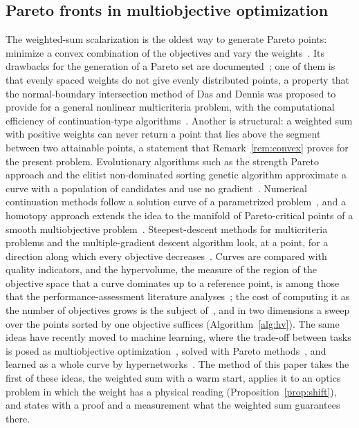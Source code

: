 \subsection{Pareto fronts in multiobjective optimization}

The weighted-sum scalarization is the oldest way to generate Pareto points: minimize a convex combination of the objectives and vary the weights~\cite{miettinen}. Its drawbacks for the generation of a Pareto set are documented~\cite{das1997}; one of them is that evenly spaced weights do not give evenly distributed points,
a property that the normal-boundary intersection method of Das and Dennis was proposed to provide for a general nonlinear multicriteria problem, with the computational efficiency of continuation-type algorithms~\cite{das1998}. Another is structural: a weighted sum with positive weights can never return a point that lies above the segment between two attainable points,
a statement that Remark~\ref{rem:convex} proves for the present problem. Evolutionary algorithms such as the strength Pareto
approach and the elitist non-dominated sorting genetic algorithm approximate a curve with a population of candidates and use no gradient~\cite{zitzler1999,deb}. Numerical continuation methods follow a solution curve of a parametrized problem~\cite{allgower}, and a homotopy approach extends the idea to the manifold of Pareto-critical points of a smooth multiobjective problem~\cite{hillermeier}.
Steepest-descent methods for multicriteria problems and the multiple-gradient descent algorithm look, at a point, for a direction along which every objective decreases~\cite{fliege,desideri}.
Curves are compared with quality indicators, and the hypervolume, the measure of the region of the objective space that a curve dominates up to a reference point, is among those that the performance-assessment literature analyses~\cite{zitzler2003}; the cost of computing it as the number of objectives grows is the subject of~\cite{beume}, and in two dimensions
a sweep over the points sorted by one objective suffices (Algorithm~\ref{alg:hv}).
The same ideas have recently moved to machine learning, where the trade-off between tasks is posed as multiobjective optimization~\cite{sener}, solved with Pareto methods~\cite{lin}, and learned as a whole curve by hypernetworks~\cite{navon}. The method of this paper takes the first of these ideas, the weighted sum with a warm start, applies it to an optics problem in which the weight has a physical reading
(Proposition~\ref{prop:shift}), and states with a proof and a measurement what the weighted sum guarantees there.

